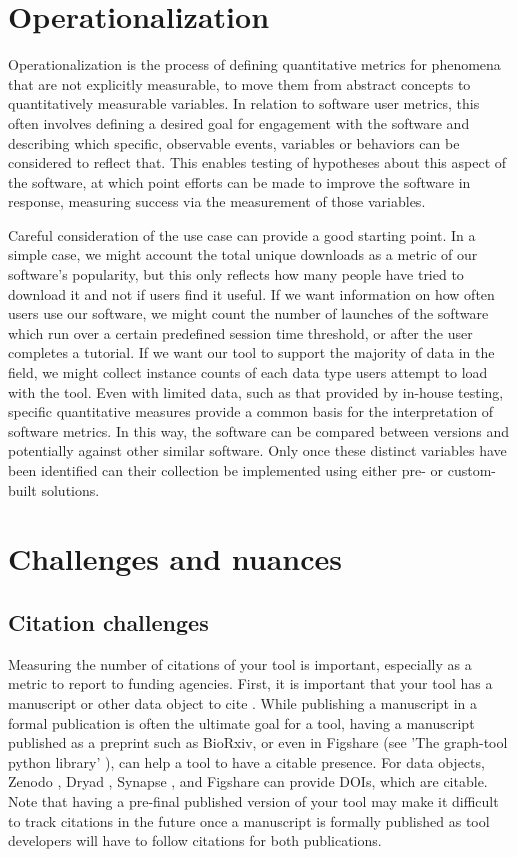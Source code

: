 \documentclass{article}
\begin{document}
\section{Operationalization}

Operationalization is the process of defining quantitative metrics for phenomena that are not explicitly measurable, to move them from abstract concepts to quantitatively measurable variables. In relation to software user metrics, this often involves defining a desired goal for engagement with the software and describing which specific, observable events, variables or behaviors can be considered to reflect that. This enables testing of hypotheses about this aspect of the software, at which point efforts can be made to improve the software in response, measuring success via the measurement of those variables. 

Careful consideration of the use case can provide a good starting point. In a simple case, we might account the total unique downloads as a metric of our software’s popularity, but this only reflects how many people have tried to download it and not if users find it useful. If we want information on how often users use our software, we might count the number of launches of the software which run over a certain predefined session time threshold, or after the user completes a tutorial. If we want our tool to support the majority of data in the field, we might collect instance counts of each data type users attempt to load with the tool. Even with limited data, such as that provided by in-house testing, specific quantitative measures provide a common basis for the interpretation of software metrics. In this way, the software can be compared between versions and potentially against other similar software. Only once these distinct variables have been identified can their collection be implemented using either pre- or custom-built solutions.

\section{Challenges and nuances}

\subsection{Citation challenges}
Measuring the number of citations of your tool is important, especially as a metric to report to funding agencies. First, it is important that your tool has a manuscript or other data object to cite \cite{chue_hong_software_2019}. While publishing a manuscript in a formal publication is often the ultimate goal for a tool, having a manuscript published as a preprint such as BioRxiv, or even in Figshare (see 'The graph-tool python library' \cite{peixoto_graph-tool_2017}), can help a tool to have a citable presence. For data objects, Zenodo \cite{zenodo}, Dryad \cite{datadryad}, Synapse \cite{synapse}, and Figshare \cite{figshare} can provide DOIs, which are citable. Note that having a pre-final published version of your tool may make it difficult to track citations in the future once a manuscript is formally published as tool developers will have to follow citations for both publications.
\end{document}
